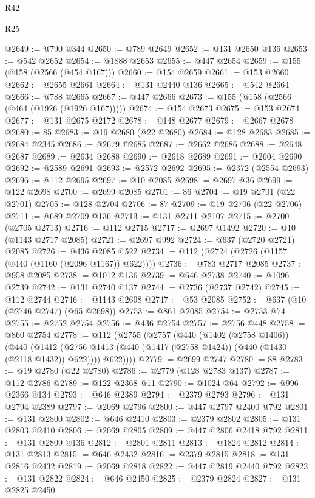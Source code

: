 \begin{lexlean}{R42}
\begin{lexlean}{R25}
\begin{coremodule}
{{{{{{{{{{{{{{{{{{{{{{{{{{{{{{{{{{{{{{{{{{{{{{{{{{{{{{{{{{{{{{{{{{{{{{{{{{{{{{{{{{{{{{{{{{{{{{{{{{{{{{{{{{{{{{{{{{{{{{{{{{{{{{{{{{{{{{{{{{{{{{{{{{{{{{{{{{{{{{{{{{{{{{{{{{{{{{{{{{{{{{{{{{{{{{{{{{{{{{{@2649 := @790 @344
@2650 := @789 @2649
@2652 := @131 @2650 @136
@2653 := @542 @2652
@2654 := @1888 @2653
@2655 := @447 @2654
@2659 := @155 (@158 (@2566 (@454 @167)))
@2660 := @154 @2659
@2661 := @153 @2660
@2662 := @2655 @2661
@2664 := @131 @2440 @136
@2665 := @542 @2664
@2666 := @788 @2665
@2667 := @447 @2666
@2673 := @155 (@158 (@2566 (@464 (@1926 (@1926 @167)))))
@2674 := @154 @2673
@2675 := @153 @2674
@2677 := @131 @2675 @2172
@2678 := @148 @2677
@2679 := @2667 @2678
@2680 := 85
@2683 := @19 @2680 (@22 @2680)
@2684 := @128 @2683
@2685 := @2684 @2345
@2686 := @2679 @2685
@2687 := @2662 @2686
@2688 := @2648 @2687
@2689 := @2634 @2688
@2690 := @2618 @2689
@2691 := @2604 @2690
@2692 := @2589 @2691
@2693 := @2572 @2692
@2695 := @2372 (@2554 @2693)
@2696 := @112 @2695
@2697 := @10 @2085
@2698 := @2697 @36
@2699 := @122 @2698
@2700 := @2699 @2085
@2701 := 86
@2704 := @19 @2701 (@22 @2701)
@2705 := @128 @2704
@2706 := 87
@2709 := @19 @2706 (@22 @2706)
@2711 := @689 @2709 @136
@2713 := @131 @2711 @2107
@2715 := @2700 (@2705 @2713)
@2716 := @112 @2715
@2717 := @2697 @1492
@2720 := @10 (@1143 @2717 @2085)
@2721 := @2697 @992
@2724 := @637 (@2720 @2721) @2085
@2726 := @436 @2085 @522
@2734 := @112 (@2724 (@2726 (@1157 (@440 (@1160 (@2096 @1167)) @622))))
@2736 := @783 @2717 @2085
@2737 := @958 @2085
@2738 := @1012 @136
@2739 := @646 @2738
@2740 := @1096 @2739
@2742 := @131 @2740 @137
@2744 := @2736 (@2737 @2742)
@2745 := @112 @2744
@2746 := @1143 @2698
@2747 := @53 @2085
@2752 := @637 (@10 (@2746 @2747) (@65 @2698))
@2753 := @861 @2085
@2754 := @2753 @74
@2755 := @2752 @2754
@2756 := @436 @2754
@2757 := @2756 @448
@2758 := @860 @2754
@2778 := @112
    (@2755
      (@2757
        (@440
          (@1402 (@2758 @1406))
          (@440
            (@1412 (@2756 @1413 (@440 (@1417 (@2758 @1424)) (@440 (@1430 (@2118 @1432)) @622))))
            @622))))
@2779 := @2699 @2747
@2780 := 88
@2783 := @19 @2780 (@22 @2780)
@2786 := @2779 (@128 @2783 @137)
@2787 := @112 @2786
@2789 := @122 @2368 @11
@2790 := @1024 @64
@2792 := @996 @2366 @134
@2793 := @646 @2389
@2794 := @2379 @2793
@2796 := @131 @2794 @2389
@2797 := @2069 @2796
@2800 := @447 @2797 @2400 @792
@2801 := @131 @2800
@2802 := @646 @2410
@2803 := @2379 @2802
@2805 := @131 @2803 @2410
@2806 := @2069 @2805
@2809 := @447 @2806 @2418 @792
@2811 := @131 @2809 @136
@2812 := @2801 @2811
@2813 := @1824 @2812
@2814 := @131 @2813
@2815 := @646 @2432
@2816 := @2379 @2815
@2818 := @131 @2816 @2432
@2819 := @2069 @2818
@2822 := @447 @2819 @2440 @792
@2823 := @131 @2822
@2824 := @646 @2450
@2825 := @2379 @2824
@2827 := @131 @2825 @2450
}}}}}}}}}}}}}}}}}}}}}}}}}}}}}}}}}}}}}}}}}}}}}}}}}}}}}}}}}}}}}}}}}}}}}}}}}}}}}}}}}}}}}}}}}}}}}}}}}}}}}}}}}}}}}}}}}}}}}}}}}}}}}}}}}}}}}}}}}}}}}}}}}}}}}}}}}}}}}}}}}}}}}}}}}}}}}}}}}}}}}}}}}}}}}}}}}}}}}}}
\end{coremodule}
\end{lexlean}
\end{lexlean}
